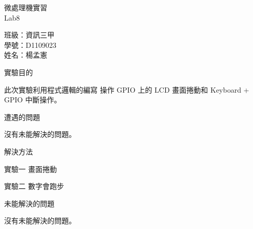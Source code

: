 \documentclass[12pt, a4paper]{article}
\begin{document}
\begin{center}
  {\Huge 微處理機實習} \\[2.5cm]
  {\Huge Lab8} \\[1.5cm]
  \hspace{.6in}
  \begin{minipage}[t]{.4\linewidth}
    {\Large 班級：資訊三甲}\\[0.5cm]
    {\Large 學號：D1109023}\\[0.5cm]
    {\Large 姓名：楊孟憲}
  \end{minipage}    
\end{center}

\newpage

\begin{description}
  \fontsize{18pt}{22pt}\selectfont 
    \item [一、]實驗目的 \\
      \begin{samepage}
        \fontsize{14pt}{16pt}\selectfont
        此次實驗利用程式邏輯的編寫 操作 GPIO 上的 LCD 畫面捲動和 Keyboard + GPIO 中斷操作。
        \end{samepage}

    \item [二、]遭遇的問題 \\
      \begin{samepage}
        \fontsize{14pt}{16pt} \selectfont
        沒有未能解決的問題。
      \end{samepage}

    \item [三、]解決方法
      \begin{description}
        \fontsize{16pt}{18pt}\selectfont
        \item [$\bullet$]實驗一\hspace{5pt} 畫面捲動 \\
        
        \item [$\bullet$]實驗二\hpace{5pt} 數字會跑步 \\
        
      \end{description}
    \item [四、]未能解決的問題 \\[.6cm]
      \begin{minipage}[t]{\linewidth}
        \fontsize{14pt}{16pt}\selectfont
        沒有未能解決的問題。
      \end{minipage}
  \normalsize
\end{description}
\end{document}
